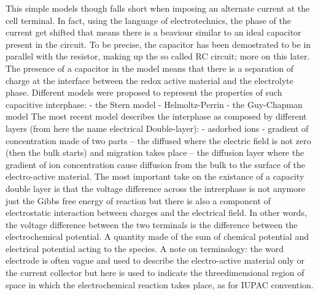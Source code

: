 This simple models though falls short when imposing an alternate current at the cell terminal. In fact, using the language of electrotechnics, the phase of the current get shifted that means there is a beaviour similar to an ideal capacitor present in the circuit. To be precise, the capacitor has been demostrated to be in parallel with the resistor, making up the so called RC circuit; more on this later. The presence of a capacitor in the model means that there is a separation of charge at the interface between the redox active material and the electrolyte phase. Different models were proposed to represent the properties of such capacitive interphase:
- the Stern model
- Helmoltz-Perrin
- the Guy-Chapman model
The most recent model describes the interphase as composed by different layers (from here the name electrical Double-layer): 
- asdorbed ions
- gradient of concentration made of two parts
-- the diffused where the electric field is not zero (then the bulk starts) and migration takes place
-- the diffusion layer where the gradient of ion concentration cause diffusion from the bulk to the surface of the electro-active material.
The most important take on the existance of a capacity double layer is that the voltage difference across the intrerphase is not anymore just the Gibbs free energy of reaction but there is also a component of electrostatic interaction between charges and the electrical field. In other words, the voltage difference between the two terminals is the difference between the electrochemical potential. A quantity made of the sum of chemical potential and electrical potential acting to the species.
A note on terminology: the word electrode is often vague and used to describe the electro-active material only or the current collector but here is used to indicate the threedimensional region of space in which the electrochemical reaction takes place, as for IUPAC convention.

